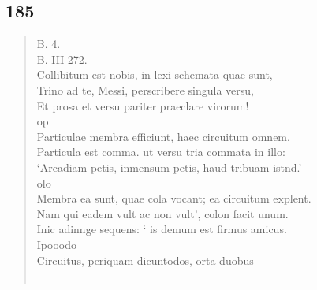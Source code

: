 \documentclass[11pt, a4paper]{report}
\begin{document}
            \subsection*{185}
      \begin{verse}
      B. 4. \\ B. III 272. \\ Collibitum est nobis, in lexi schemata quae sunt, \\ Trino ad te, Messi, perscribere singula versu, \\ Et prosa et versu pariter praeclare virorum! \\ op \\ Particulae membra efficiunt, haec circuitum omnem. \\ Particula est comma. ut versu tria commata in illo: \\ ‘Arcadiam petis, inmensum petis, haud tribuam istnd.’ \\ olo \\ Membra ea sunt, quae cola vocant; ea circuitum explent. \\ Nam qui eadem vult ac non vult’, colon facit unum. \\ Inic adinnge sequens: ‘ is demum est firmus amicus. \\ Ipooodo \\ Circuitus, periquam dicuntodos, orta duobus \\ 
        ﻿\pagebreak 

\end{verse}
\end{document}
